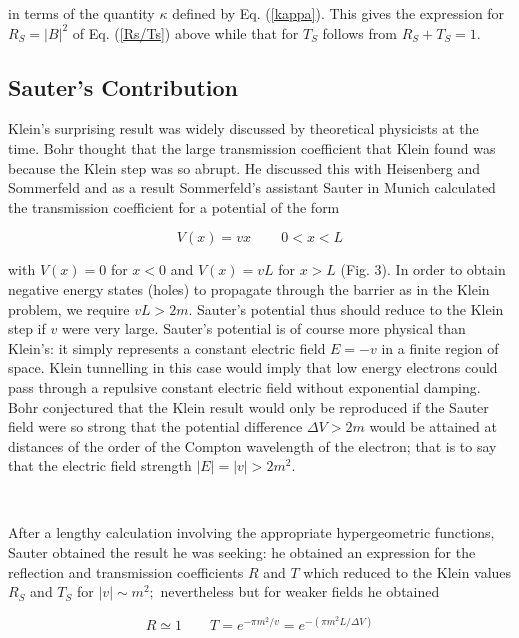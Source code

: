 \noindent in terms of the quantity $\kappa $ defined by Eq. (\ref{kappa}).
This gives the expression for $R_S=\left| B\right| ^2$ of Eq. (\ref{Rs/Ts})
above while that for $T_S$ follows from $R_S+T_S=1$.

\subsection{Sauter's Contribution}

\noindent Klein's surprising result was widely discussed by theoretical
physicists at the time. Bohr thought that the large transmission coefficient
that Klein found was because the Klein step was so abrupt. He discussed this
with Heisenberg and Sommerfeld and as a result Sommerfeld's assistant Sauter%
\cite{saut} in Munich calculated the transmission coefficient for a
potential of the form

\begin{equation}
V(x)=vx\,\qquad 0<x<L  \label{saut}
\end{equation}

\noindent with $V(x)=0$ for $x<0$ and $V(x)=vL$ for $x>L$ (Fig. 3). In order
to obtain negative energy states (holes) to propagate through the barrier as
in the Klein problem, we require $vL>2m$. Sauter's potential thus should
reduce to the Klein step if $v$ were very large. Sauter's potential is of
course more physical than Klein's: it simply represents a constant electric
field $E=-v$ in a finite region of space. Klein tunnelling in this case
would imply that low energy electrons could pass through a repulsive
constant electric field without exponential damping. Bohr conjectured that
the Klein result would only be reproduced if the Sauter field were so strong
that the potential difference $\Delta V>2m$ would be attained at distances
of the order of the Compton wavelength of the electron; that is to say that
the electric field strength $\left| E\right| =\left| v\right| >2m^2$.

\smallskip\ 

\noindent After a lengthy calculation involving the appropriate
hypergeometric functions, Sauter obtained the result he was seeking: he
obtained an expression for the reflection and transmission coefficients $R$
and $T$ which reduced to the Klein values $R_S$ and $T_S$ for $\left|
v\right| \sim m^2;$ nevertheless but for weaker fields he obtained

\begin{equation}
R\simeq 1\qquad T=e^{-\pi m^2/v}=e^{-(\pi m^2L/\Delta V)}  \label{sautres}
\end{equation}

